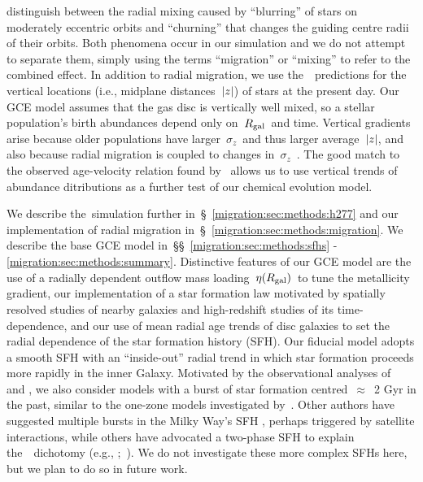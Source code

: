 \citet{Schoenrich2009a} distinguish between the radial mixing caused by 
``blurring'' of stars on moderately eccentric orbits and ``churning'' that 
changes the guiding centre radii of their orbits. 
Both phenomena occur in our simulation and we do not attempt to separate them, 
simply using the terms ``migration'' or ``mixing'' to refer to the combined 
effect. 
In addition to radial migration, we use the~\hsim~predictions for the vertical 
locations (i.e., midplane distances~$\left|z\right|$) of stars at the present day. 
Our GCE model assumes that the gas disc is vertically well mixed, so a stellar 
population's birth abundances depend only on~$R_\text{gal}$~and time. 
Vertical gradients arise because older populations have larger~$\sigma_z$~and 
thus larger average~$\left|z\right|$, and also because radial migration is 
coupled to changes in~$\sigma_z$~\citep*{Solway2012}. 
The good match to the observed age-velocity relation found by~\citet{Bird2021} 
allows us to use vertical trends of abundance ditributions as a further test 
of our chemical evolution model. 
\par 
We describe the~\hsim simulation further in~\S~\ref{migration:sec:methods:h277} and our 
implementation of radial migration in~\S~\ref{migration:sec:methods:migration}. 
We describe the base GCE model in~\S\S~\ref{migration:sec:methods:sfhs} - 
\ref{migration:sec:methods:summary}. Distinctive features of our GCE model are the use 
of a radially dependent outflow mass loading~$\eta(R_\text{gal})$~to tune the 
metallicity gradient, our implementation of a star formation law motivated by 
spatially resolved studies of nearby galaxies and high-redshift studies of its 
time-dependence, and our use of mean radial age trends of disc galaxies to set 
the radial dependence of the star formation history (SFH). 
Our fiducial model adopts a smooth SFH with an ``inside-out'' radial trend in 
which star formation proceeds more rapidly in the inner Galaxy. 
Motivated by the observational analyses of~\citet{Isern2019} and 
\citet{Mor2019}, we also consider models with a burst of star formation 
centred~$\approx$~2 Gyr in the past, similar to the one-zone models 
investigated by~\citet{Johnson2020}. 
Other authors have suggested multiple bursts in the Milky Way's SFH
\citep[e.g.,][]{Lian2020a, Lian2020b, RuizLara2020, Sysoliatina2021}, perhaps
triggered by satellite interactions, while others 
have advocated a two-phase SFH to explain the~\afe~dichotomy (e.g., 
\citealp*{Chiappini1997};~\citealp{Haywood2016, Mackereth2018, Spitoni2019, 
Buck2020a, Khoperskov2021}). We do not investigate these more complex SFHs 
here, but we plan to do so in future work. 

